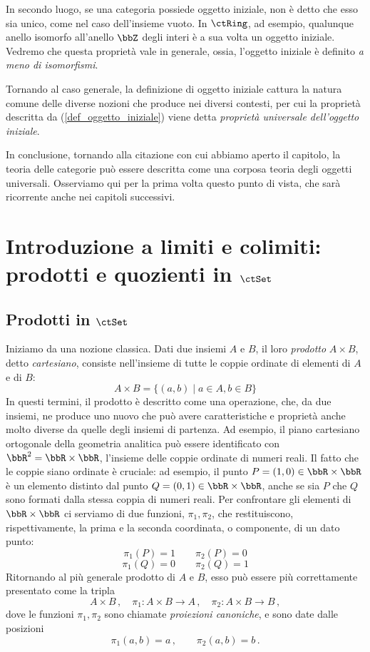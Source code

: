 In secondo luogo, se una categoria possiede oggetto iniziale, non è detto che esso sia unico, come nel caso dell'insieme vuoto. In \(\ctRing\), ad esempio, qualunque anello isomorfo all'anello  \(\bbZ\) degli interi è a sua volta un oggetto iniziale. Vedremo che questa proprietà vale in generale, ossia, l'oggetto iniziale è definito \emph{a meno di isomorfismi}.

Tornando al caso generale, la definizione di oggetto iniziale cattura la natura comune delle diverse nozioni che produce nei diversi contesti, per cui la proprietà descritta da (\ref{def_oggetto_iniziale}) viene detta \emph{proprietà universale dell'oggetto iniziale}. 



In conclusione, tornando alla citazione con cui abbiamo aperto il capitolo, la teoria delle categorie può essere descritta come una corposa teoria degli oggetti universali. Osserviamo qui per la prima volta questo punto di vista, che sarà ricorrente anche nei capitoli successivi.





\section{Introduzione a limiti e colimiti: prodotti e quozienti in \(\ctSet\)} 

\subsection*{Prodotti in \(\ctSet\)}\label{prod_in_Set}
Iniziamo da una nozione classica. 
Dati due insiemi \(A\) e \(B\), il loro \emph{prodotto} \(A\times B\), detto \emph{cartesiano}, consiste nell'insieme di tutte le coppie ordinate di elementi di \(A\) e di \(B\):
\[
A\times B= \{(a,b)\mid a\in A, b\in B\}
\]
In questi termini, il prodotto è descritto come una operazione, che, da due insiemi, ne produce uno nuovo che può avere caratteristiche e proprietà anche molto diverse da quelle degli insiemi di partenza. Ad esempio, il piano cartesiano ortogonale della geometria analitica può essere identificato con \(\bbR^2=\bbR\times\bbR\), l'insieme delle coppie ordinate di numeri reali. Il fatto che le coppie siano ordinate è cruciale: ad esempio, il punto \(P=(1,0)\in \bbR\times\bbR\) è un elemento distinto dal punto \(Q=(0,1)\in \bbR\times\bbR\), anche se sia $P$ che $Q$ sono formati dalla stessa coppia di numeri reali. Per confrontare gli elementi di \(\bbR\times\bbR\) ci serviamo di due funzioni, \(\pi_1,\pi_2\), che restituiscono, rispettivamente, la prima e la seconda coordinata, o componente, di un dato punto:
\[
\pi_1(P)=1\qquad \pi_2(P)=0
\]
\[
\pi_1(Q)=0\qquad \pi_2(Q)=1
\]
Ritornando al più generale prodotto di \(A\) e \(B\), esso può essere più correttamente presentato come la tripla
\[
A\times B\,,\quad \pi_1\colon A\times B\to A\,,\quad \pi_2\colon A\times B\to B\,,
\]
dove le funzioni \(\pi_1,\pi_2\) sono chiamate \emph{proiezioni canoniche}, e sono date dalle posizioni
\[
\pi_1(a,b)=a\,,\qquad \pi_2(a,b)=b\,.
\]

